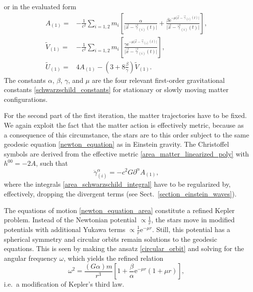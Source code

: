 or in the evaluated form
\begin{equation}
  \begin{aligned}
    A_{(1)} = {} & -\frac{1}{c^2} \sum_{i=1,2} m_i \left\lbrack\frac{\alpha}{\lvert\vec x-\vec\gamma_{(i)}(t)\rvert} + \frac{\beta\mathrm e^{-\mu\lvert\vec x-\vec\gamma_{(i)}(t)\rvert}}{\lvert\vec x-\vec\gamma_{(i)}(t)\rvert} \right\rbrack, \\
    \tilde V_{(1)} = {} & -\frac{1}{c^2} \sum_{i=1,2} m_i \left\lbrack\frac{\gamma\mathrm e^{-\mu\lvert\vec x-\vec\gamma_{(i)}(t)\rvert}}{\lvert\vec x-\vec\gamma_{(i)}(t)\rvert} \right\rbrack, \\
    \tilde U_{(1)} = {} & 4 A_{(1)} - (3 + 8 \frac{\beta}{\gamma})\tilde V_{(1)}.
  \end{aligned}
\end{equation}
The constants $\alpha$, $\beta$, $\gamma$, and $\mu$ are the four relevant first-order gravitational constants \eqref{schwarzschild_constants} for stationary or slowly moving matter configurations.

For the second part of the first iteration, the matter trajectories have to be fixed. We again exploit the fact that the matter action is effectively metric, because as a consequence of this circumstance, the stars are to this order subject to the same geodesic equation \eqref{newton_equation} as in Einstein gravity. The Christoffel symbols are derived from the effective metric \eqref{area_matter_linearized_poly} with $h^{00} = -2A$, such that
\begin{equation}\label{newton_equation_area}
  \ddot \gamma^{\alpha}_{(i)} = - c^2 G \partial^\alpha A_{(1)},
\end{equation}
where the integrals \eqref{area_schwarzschild_integral} have to be regularized by, effectively, dropping the divergent terms (see Sect.~\ref{section_einstein_waves}).

The equations of motion \eqref{newton_equation_area} constitute a refined Kepler problem. Instead of the Newtonian potential $\propto \frac{1}{r}$, the stars move in modified potentials with additional Yukawa terms $\propto \frac{1}{r} \mathrm e^{-\mu r}$. Still, this potential has a spherical symmetry and circular orbits remain solutions to the geodesic equations. This is seen by making the ansatz \eqref{circular_orbit} and solving for the angular frequency $\omega$, which yields the refined relation
\begin{equation}
  \omega^2 = \frac{(G\alpha) m}{r^3}\left\lbrack 1 + \frac{\beta}{\alpha}\mathrm e^{-\mu r}(1 + \mu r)\right\rbrack,
\end{equation}
i.e.~a modification of Kepler's third law.

